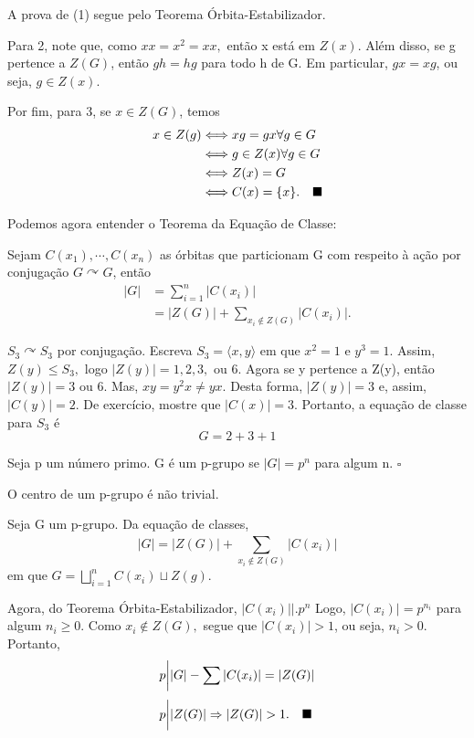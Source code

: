 \documentclass[algebra_notes.tex]{subfiles}
\begin{document}
\begin{proof*}
	A prova de (1) segue pelo Teorema Órbita-Estabilizador.

	Para 2, note que, como \(xx = x^{2} = xx,\) então x está em \(Z(x).\) Além disso,
	se g pertence a \(Z(G)\), então \(gh = hg\) para todo h de G. Em particular, \(gx = xg\),
	ou seja, \(g\in Z(x)\).

	Por fim, para 3, se \(x\in Z(G)\), temos
	\begin{align*}
		x\in Z(g) & \Longleftrightarrow xg=gx \forall g\in G                \\
		          & \Longleftrightarrow g\in Z(x) \forall g\in G            \\
		          & \Longleftrightarrow Z(x) = G                            \\
		          & \Longleftrightarrow C(x) = \{x\}.\quad\text{$\blacksquare$}
	\end{align*}
\end{proof*}
Podemos agora entender o Teorema da Equação de Classe:
\hypertarget{class_eqn}{
	\begin{theorem*}
		Sejam \(C(x_{1}), \cdots, C(x_{n})\) as órbitas que particionam G com respeito
		à ação por conjugação \(G \curvearrowright G\), então
		\begin{align*}
			|G| & = \sum\limits_{i=1}^{n}|C(x_{i})|                        \\
			    & = |Z(G)| + \sum\limits_{x_{i}\not\in Z(G)}^{}|C(x_{i})|.
		\end{align*}
	\end{theorem*}}
\begin{example*}
	\(S_{3} \curvearrowright S_{3}\) por conjugação. Escreva \(S_{3} = \langle x, y \rangle\)
	em que \(x^{2} = 1\) e \(y^{3}=1.\) Assim, \(Z(y)\leq S_{3},\) logo \(|Z(y)| = 1, 2, 3,\) ou 6.
	Agora se y pertence a Z(y), então \(|Z(y)| = 3\) ou 6. Mas, \(xy=y^{2}x\neq yx.\) Desta forma,
	\(|Z(y)|=3\) e, assim, \(|C(y)|=2.\) De exercício, mostre que \(|C(x)| = 3.\)
	Portanto, a equação de classe para \(S_{3}\) é
	\[
		G = 2 + 3 + 1
	\]
\end{example*}
\begin{def*}
	Seja p um número primo. G é um p-grupo se \(|G| = p^{n}\) para algum n. \(\square\)
\end{def*}
\begin{prop*}
	O centro de um p-grupo é não trivial.
\end{prop*}
\begin{proof*}
	Seja G um p-grupo. Da equação de classes,
	\[
		|G| = |Z(G)| + \sum\limits_{x_{i}\not\in Z(G)}^{}|C(x_{i})|
	\]
	em que \(G = \bigsqcup_{i=1}^{n}{C(x_{i})}\sqcup Z(g).\)

	Agora, do Teorema Órbita-Estabilizador, \(|C(x_{i})|\biggl|\biggr. p^{n}\) Logo,
	\(|C(x_{i})| = p^{n_{i}}\) para algum \(n_{i}\geq 0\). Como \(x_{i}\not\in Z(G),\) segue
	que \(|C(x_{i})| > 1\), ou seja, \(n_{i} > 0.\) Portanto,
	\begin{align*}
		 & p\biggl|\biggr. |G| - \sum\limits_{}^{}|C(x_{i})| = |Z(G)|           \\
		 & p\biggl|\biggr. |Z(G)| \Rightarrow |Z(G)| > 1.\quad\text{$\blacksquare$}
	\end{align*}
\end{proof*}
\end{document}
